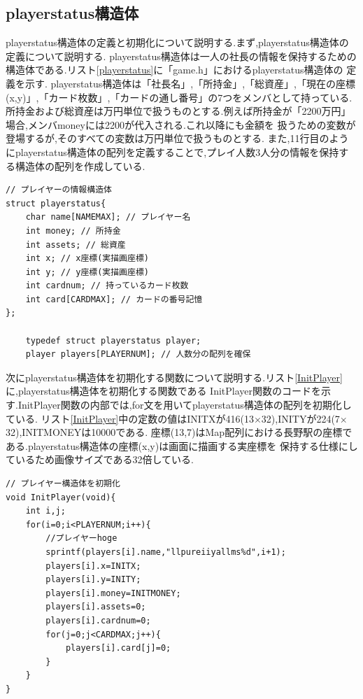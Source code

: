 \documentclass[a4j]{jarticle}
\begin{document}
    \subsection{playerstatus構造体}
    playerstatus構造体の定義と初期化について説明する.まず,playerstatus構造体の定義について説明する.
    playerstatus構造体は一人の社長の情報を保持するための構造体である.リスト\ref{playerstatus}に「game.h」におけるplayerstatus構造体の
    定義を示す. playerstatus構造体は「社長名」,「所持金」,「総資産」,「現在の座標(x,y)」,「カード枚数」,「カードの通し番号」の7つをメンバとして持っている.
    所持金および総資産は万円単位で扱うものとする.例えば所持金が「2200万円」場合,メンバmoneyには2200が代入される.これ以降にも金額を
    扱うための変数が登場するが,そのすべての変数は万円単位で扱うものとする.
    また,11行目のようにplayerstatus構造体の配列を定義することで,プレイ人数3人分の情報を保持する構造体の配列を作成している.
    \begin{lstlisting}[basicstyle=\ttfamily\footnotesize, frame=single,label=playerstatus,caption=playerstatus構造体の定義と初期化]
// プレイヤーの情報構造体
struct playerstatus{
    char name[NAMEMAX]; // プレイヤー名
    int money; // 所持金
    int assets; // 総資産
    int x; // x座標(実描画座標)
    int y; // y座標(実描画座標)
    int cardnum; // 持っているカード枚数
    int card[CARDMAX]; // カードの番号記憶
};
    
    typedef struct playerstatus player;
    player players[PLAYERNUM]; // 人数分の配列を確保
    \end{lstlisting}

    次にplayerstatus構造体を初期化する関数について説明する.リスト\ref{InitPlayer}に,playerstatus構造体を初期化する関数である
    InitPlayer関数のコードを示す.InitPlayer関数の内部では,for文を用いてplayerstatus構造体の配列を初期化している.
    リスト\ref{InitPlayer}中の定数の値はINITXが416(13$\times$32),INITYが224(7$\times$32),INITMONEYは10000である.
    座標(13,7)はMap配列における長野駅の座標である.playerstatus構造体の座標(x,y)は画面に描画する実座標を
    保持する仕様にしているため画像サイズである32倍している.
    \begin{lstlisting}[basicstyle=\ttfamily\footnotesize, frame=single,label=InitPlayer,caption=InitPlayer関数]
// プレイヤー構造体を初期化
void InitPlayer(void){
    int i,j;
    for(i=0;i<PLAYERNUM;i++){
        //プレイヤーhoge
        sprintf(players[i].name,"llpureiiyallms%d",i+1);
        players[i].x=INITX;
        players[i].y=INITY;
        players[i].money=INITMONEY;
        players[i].assets=0;
        players[i].cardnum=0;
        for(j=0;j<CARDMAX;j++){
            players[i].card[j]=0;
        }
    }
}
            \end{lstlisting}
\end{document}
